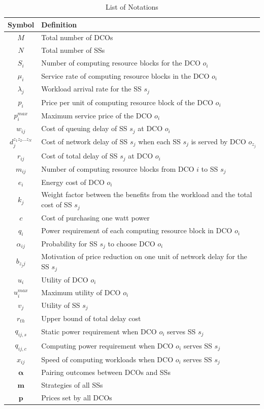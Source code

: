 \documentclass[twocolumn,10pt]{IEEEtran}
\begin{document}
\begin{table}

\caption{List of Notations}
\begin{tabular}{c|p{5.8 cm}}
\hline
Symbol & Definition\\
\hline
$M$ & Total number of DCOs \\
$N$ & Total number of SSs \\
$S_i$ & Number of computing resource blocks for the DCO $o_i$ \\
$\mu_i$ & Service rate of computing resource blocks in the DCO $o_i$ \\
$\lambda_{j}$ & Workload arrival rate for the SS $s_j$ \\
$p_i$ & Price per unit of computing resource block of the DCO $o_i$ \\
$p^{max}_i$ & Maximum service price of the DCO $o_i$ \\
$w_{ij}$ & Cost of queuing delay of SS $s_j$ at DCO $o_i$ \\
$d^{z_1z_2\ldots z_N}_j$ & Cost of network delay of SS $s_j$ when each SS $s_j$ is served by DCO $o_{z_j}$\\
$r_{ij}$ & Cost of total delay of SS $s_j$ at DCO $o_i$ \\
$m_{ij}$ & Number of computing resource blocks from DCO $i$ to SS $s_j$\\
$e_{i}$ & Energy cost of DCO $o_i$\\
$k_j$ & Weight factor between the benefits from the workload and the total cost of SS $s_j$ \\
$c$ & Cost of purchasing one watt power\\
$q_{i}$ & Power requirement of each computing resource block in DCO $o_i$\\
$\alpha_{ij}$ & Probability for SS $s_j$ to choose DCO $o_i$\\
${b_{{z_j}j}}$ & Motivation of price reduction on one unit of network delay for the SS $s_j$\\
$u_{i}$ & Utility of DCO $o_i$\\
$u^{max}_{i}$ & Maximum utility of DCO $o_i$\\
$v_{j}$ & Utility of SS $s_j$\\
$r_{th}$ & Upper bound of total delay cost\\
$q_{ij,s}$  &  Static power requirement when DCO $o_i$ serves SS $s_j$ \\
$q_{ij,c}$ &   Computing power requirement when DCO $o_i$ serves SS $s_j$ \\
$x_{ij}$  & Speed of computing workloads when DCO $o_i$ serves SS $s_j$ \\
$\boldsymbol{\alpha}$ & Pairing outcomes between DCOs and SSs\\
$\boldsymbol{m}$ & Strategies of all SSs\\
$\boldsymbol{p}$ & Prices set by all DCOs\\
\hline
\end{tabular}\\

\end{table}
\end{document}
